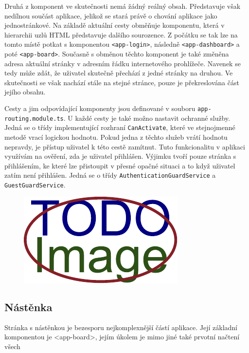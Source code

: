 Druhá z komponent ve skutečnosti nemá žádný reálný obsah. Představuje však nedílnou součást aplikace, jelikož se stará právě o chování aplikace jako jednostránkové. Na základě aktuální cesty obměňuje komponentu, která v hierarchii uzlů HTML představuje dalšího sourozence. Z počátku se tak lze na tomto místě potkat s komponentou \texttt{<app-login>}, následně \texttt{<app-dashboard>} a poté \texttt{<app-board>}. Současně s obměnou těchto komponent je také změněna adresa aktuální stránky v adresním řádku internetového prohlížeče. Navenek se tedy může zdát, že uživatel skutečně přechází z jedné stránky na druhou. Ve skutečnosti se však nachází stále na stejné stránce, pouze je překreslována část jejího obsahu.

Cesty a jim odpovídající komponenty jsou definované v souboru \texttt{app-routing.module.ts}. U každé cesty je také možno nastavit ochranné služby. Jedná se o třídy implementující rozhraní \texttt{CanActivate}, které ve stejnojmenné metodě vrací logickou hodnotu. Pokud jedna z těchto služeb vrátí hodnotu nepravdy, je přístup uživatel k této cestě zamítnut. Tuto funkcionalitu v aplikaci využívám na ověření, zda je uživatel přihlášen. Výjimku tvoří pouze stránka s přihlášením, ke které lze přistoupit v přesné opačné situaci a to když uživatel zatím není přihlášen. Jedná se o třídy \texttt{AuthenticationGuardService} a \texttt{GuestGuardService}.

\begin{figure}[H]
	\centering
	\includegraphics[width=\textwidth]{obrazky-figures/placeholder.pdf}
\end{figure}


\subsection{Nástěnka}
Stránka s nástěnkou je bezesporu nejkomplexnější částí aplikace. Její základní komponentou je <app-board>, jejím úkolem je mimo jiné také prvotní načtení všech %

